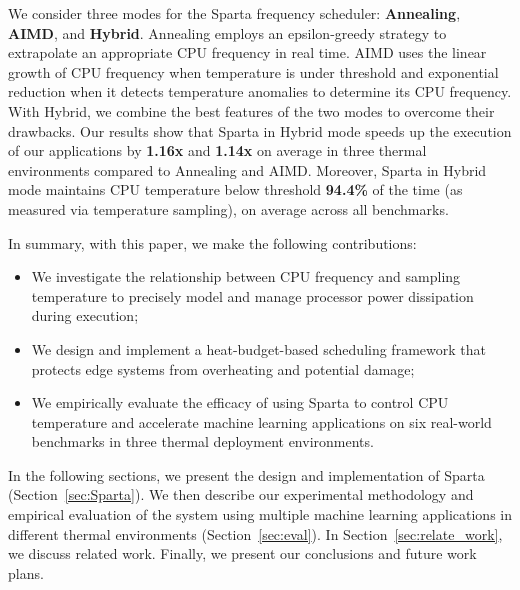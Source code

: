 
We consider three modes for the Sparta frequency scheduler: \textbf{Annealing}, \textbf{AIMD}, and \textbf{Hybrid}.  Annealing employs an epsilon-greedy strategy to extrapolate an appropriate CPU frequency in real time. AIMD uses the linear growth of CPU frequency when temperature is under threshold and exponential reduction when it detects temperature anomalies to determine its CPU frequency.  With Hybrid, we combine the best features of the two modes to overcome their drawbacks. Our results show that Sparta in Hybrid mode speeds up the execution of our applications by \textbf{1.16x} and \textbf{1.14x} on average in three thermal environments compared to Annealing and AIMD. Moreover, Sparta in Hybrid mode maintains CPU temperature below threshold \textbf{94.4\%} of the time (as measured via temperature sampling), on average across all benchmarks. 

In summary, with this paper, we make the following contributions:
\begin{itemize}
    \item We investigate the relationship between CPU frequency and sampling temperature to precisely model and manage processor power dissipation during execution;
    \vspace{1mm}
    \item We design and implement a heat-budget-based scheduling framework that protects edge systems from overheating and potential damage;
    \vspace{1mm}
    \item We empirically evaluate the efficacy of using Sparta to control CPU temperature and accelerate machine learning applications on six real-world benchmarks in three thermal deployment environments. 
\end{itemize}

In the following sections, we present the design and implementation of Sparta (Section~\ref{sec:Sparta}). We then describe our experimental methodology and empirical evaluation of the system using multiple machine learning applications in different thermal environments (Section~\ref{sec:eval}). In Section~\ref{sec:relate_work},  we discuss related work. Finally, we present our conclusions and future work plans.



